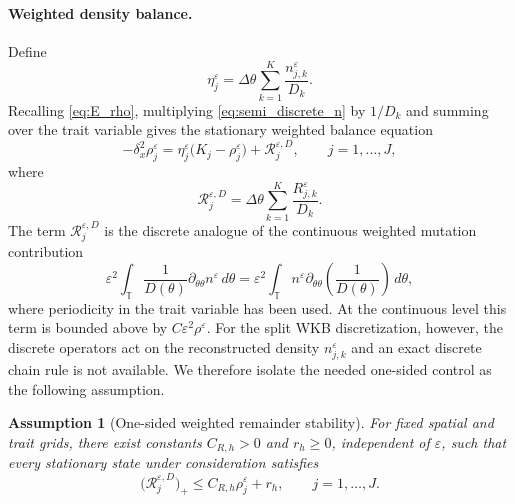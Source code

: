 \documentclass[11pt]{article}
\newtheorem{assumption}{Assumption}[section]
\begin{document}
\paragraph{Weighted density balance.}
Define
\begin{equation}\label{def:eta}
    \eta_j^\varepsilon
    =
    \Delta\theta
    \sum_{k=1}^K
    \frac{n_{j,k}^\varepsilon}{D_k}.
\end{equation}
Recalling \eqref{eq:E_rho}, multiplying \eqref{eq:semi_discrete_n} by \(1/D_k\) and summing over the
trait variable gives the stationary weighted balance equation
\begin{equation}\label{eq:weighted_summed_density_stationary}
    -\delta_x^2\rho_j^\varepsilon
    =
    \eta_j^\varepsilon
    \bigl(K_j-\rho_j^\varepsilon\bigr)
    +
    \mathcal R_j^{\varepsilon,D},
    \qquad j=1,\ldots,J,
\end{equation}
where
\begin{equation}
    \mathcal R_j^{\varepsilon,D}
    =
    \Delta\theta
    \sum_{k=1}^K
    \frac{R_{j,k}^\varepsilon}{D_k}.
\end{equation}
The term \(\mathcal R_j^{\varepsilon,D}\) is the discrete analogue of the
continuous weighted mutation contribution
\[
    \varepsilon^2
    \int_{\mathbb T}
    \frac1{D(\theta)}
    \partial_{\theta\theta}n^\varepsilon
    \,d\theta
    =
    \varepsilon^2
    \int_{\mathbb T}
    n^\varepsilon
    \partial_{\theta\theta}\left(\frac1{D(\theta)}\right)
    \,d\theta ,
\]
where periodicity in the trait variable has been used.  At the continuous
level this term is bounded above by \(C\varepsilon^2\rho^\varepsilon\).  For
the split WKB discretization, however, the discrete operators act on the
reconstructed density
$
    n_{j,k}^\varepsilon
$
and an exact discrete chain rule is not available.  We therefore isolate the
needed one-sided control as the following assumption.



\begin{assumption}[One-sided weighted remainder stability]
\label{ass:remainder_stability}
For fixed spatial and trait grids, there exist constants \(C_{R,h}>0\) and \(r_h\ge0\), independent of
\(\varepsilon\), such that every stationary state under consideration
satisfies
\begin{equation}\label{eq:remainder_CR_bound}
    \bigl(\mathcal R_j^{\varepsilon,D}\bigr)_+
    \le
    C_{R,h} \rho_j^\varepsilon+r_h,
    \qquad j=1,\ldots,J .
\end{equation}
\end{assumption}
\end{document}
